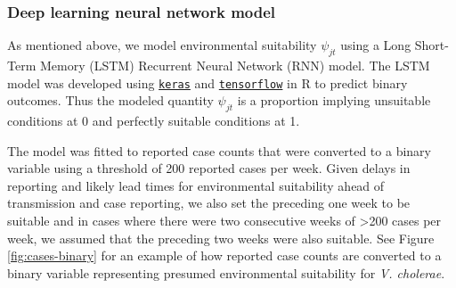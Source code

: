 \documentclass[
]{book}
\begin{document}
\subsubsection{Deep learning neural network model}\label{deep-learning-neural-network-model}

As mentioned above, we model environmental suitability \(\psi_{jt}\) using a Long Short-Term Memory (LSTM) Recurrent Neural Network (RNN) model. The LSTM model was developed using \href{https://cran.r-project.org/package=keras}{\texttt{keras}} and \href{https://cran.r-project.org/package=tensorflow}{\texttt{tensorflow}} in R to predict binary outcomes. Thus the modeled quantity \(\psi_{jt}\) is a proportion implying unsuitable conditions at 0 and perfectly suitable conditions at 1.

The model was fitted to reported case counts that were converted to a binary variable using a threshold of 200 reported cases per week. Given delays in reporting and likely lead times for environmental suitability ahead of transmission and case reporting, we also set the preceding one week to be suitable and in cases where there were two consecutive weeks of \textgreater200 cases per week, we assumed that the preceding two weeks were also suitable. See Figure \ref{fig:cases-binary} for an example of how reported case counts are converted to a binary variable representing presumed environmental suitability for \emph{V. cholerae}.
\end{document}
